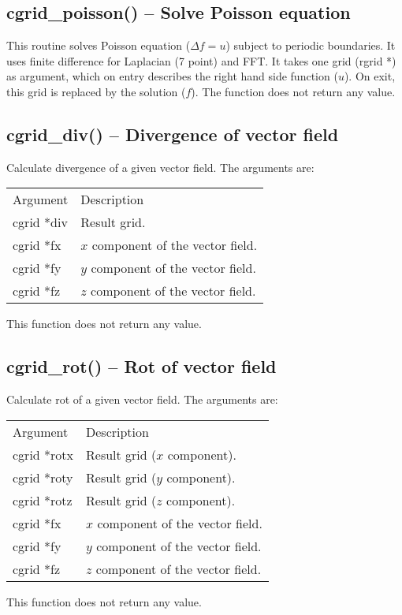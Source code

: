 \documentclass[12pt,letterpaper]{report}
\begin{document}
\subsection{cgrid\_poisson() -- Solve Poisson equation}

This routine solves Poisson equation ($\Delta f = u$) subject to periodic boundaries. It
uses finite difference for Laplacian (7 point) and FFT. It takes one grid (rgrid *) as argument, which on entry describes the right hand side function ($u$). On exit, this grid is replaced by the solution ($f$). The function does not return any value.

\subsection{cgrid\_div() -- Divergence of vector field}

Calculate divergence of a given vector field. The arguments are:
\begin{longtable}{p{} p{}}
Argument & Description\\
\cline{1-2}
cgrid *div & Result grid.\\
cgrid *fx  & $x$ component of the vector field.\\
cgrid *fy  & $y$ component of the vector field.\\
cgrid *fz  & $z$ component of the vector field.\\
\end{longtable}
\noindent
This function does not return any value. 

\subsection{cgrid\_rot() -- Rot of vector field}

Calculate rot of a given vector field. The arguments are:
\begin{longtable}{p{} p{}}
Argument & Description\\
\cline{1-2}
cgrid *rotx & Result grid ($x$ component).\\
cgrid *roty & Result grid ($y$ component).\\
cgrid *rotz & Result grid ($z$ component).\\
cgrid *fx  & $x$ component of the vector field.\\
cgrid *fy  & $y$ component of the vector field.\\
cgrid *fz  & $z$ component of the vector field.\\
\end{longtable}
\noindent
This function does not return any value. 
\end{document}
